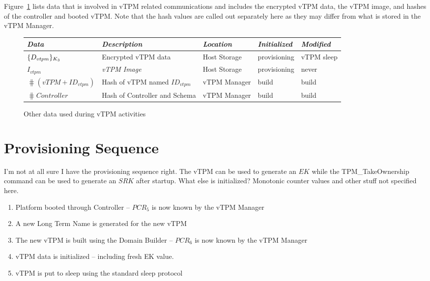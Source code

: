 \documentclass[10pt]{article}
\begin{document}
Figure~\ref{fig:other-data} lists data that is involved in vTPM
related communications and includes the encrypted vTPM data, the vTPM
image, and hashes of the controller and booted vTPM.  Note that the
hash values are called out separately here as they may differ from
what is stored in the vTPM Manager.

\begin{figure}[hbtp]
  \centering
  \begin{tabular}{lllll}
    \emph{Data} & \emph{Description} & \emph{Location} &
    \emph{Initialized} & \emph{Modified} \\ \hline
    $\{D_{vtpm}\}_{K_{3}}$ & Encrypted vTPM data & Host Storage &
    provisioning & vTPM sleep \\
    $I_{vtpm}$ & \emph{vTPM Image} & Host Storage & provisioning & never
    \\
    $\hash{(vTPM+ID_{vtpm})}$ & Hash of vTPM named $ID_{vtpm}$ & vTPM
    Manager & build & build \\ 
    $\hash{Controller}$ & Hash of Controller and Schema & vTPM
    Manager & build & build \\ 
  \end{tabular}
  \caption{Other data used during vTPM activities}
  \label{fig:other-data}
\end{figure}

\section{Provisioning Sequence}

I'm not at all sure I have the provisioning sequence right.  The vTPM
can be used to generate an $EK$ while the \textsf{TPM\_TakeOwnership}
command can be used to generate an $SRK$ after startup.  What else is
initialized?  Monotonic counter values and other stuff not specified here.

\begin{enumerate}
\item Platform booted through Controller -- $PCR_5$ is now known by
  the vTPM Manager
\item A new Long Term Name is generated for the new vTPM
\item The new vTPM is built using the Domain Builder -- $PCR_6$ is now
  known by the vTPM Manager
\item vTPM data is initialized -- including fresh EK value.
\item vTPM is put to sleep using the standard sleep protocol
\end{enumerate}
\end{document}
